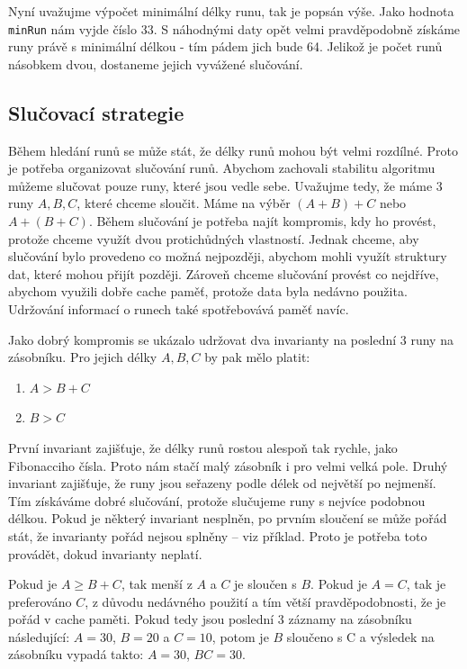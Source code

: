 \documentclass[thesis=B,czech]{FITthesis}[2019/12/23]
\begin{document}
Nyní uvažujme výpočet minimální délky runu, tak je popsán výše. Jako hodnota \texttt{minRun} nám vyjde číslo 33. S náhodnými daty opět velmi pravděpodobně získáme runy právě s minimální délkou - tím pádem jich bude 64. Jelikož je počet runů násobkem dvou, dostaneme jejich vyvážené slučování.

\subsection{Slučovací strategie}
Během hledání runů se může stát, že délky runů mohou být velmi rozdílné. Proto je potřeba organizovat slučování runů. Abychom zachovali stabilitu algoritmu můžeme slučovat pouze runy, které jsou vedle sebe. Uvažujme tedy, že máme 3 runy $ A, B, C $, které chceme sloučit. Máme na výběr $ (A+B)+C $ nebo $ A+(B+C) $. Během slučování je potřeba najít kompromis, kdy ho provést, protože chceme využít dvou protichůdných vlastností. Jednak chceme, aby slučování bylo provedeno co možná nejpozději, abychom mohli využít struktury dat, které mohou přijít později. Zároveň chceme slučování provést co nejdříve, abychom využili dobře cache paměť, protože data byla nedávno použita. Udržování informací o runech také spotřebovává paměť navíc.

Jako dobrý kompromis se ukázalo udržovat dva invarianty na poslední 3 runy na zásobníku. Pro jejich délky $A, B, C$ by pak mělo platit: 
\begin{center}
\begin{varwidth}{\textwidth}
\begin{enumerate}
	\item $ A > B + C $
	\item $ B > C $
\end{enumerate}
\end{varwidth}
\end{center} 
První invariant zajišťuje, že délky runů rostou alespoň tak rychle, jako Fibonacciho čísla. Proto nám stačí malý zásobník i pro velmi velká pole. Druhý invariant zajišťuje, že runy jsou seřazeny podle délek od největší po nejmenší. Tím získáváme dobré slučování, protože slučujeme runy s nejvíce podobnou délkou. Pokud je některý invariant nesplněn, po prvním sloučení se může pořád stát, že invarianty pořád nejsou splněny -- viz příklad. Proto je potřeba toto provádět, dokud invarianty neplatí. 

Pokud je $A \ge B + C$, tak menší z $A$ a $C$ je sloučen s $B$. Pokud je $A=C$, tak je preferováno $C$, z důvodu nedávného použití a tím větší pravděpodobnosti, že je pořád v cache paměti. Pokud tedy jsou poslední 3 záznamy na zásobníku následující: $A=30$, $B=20$ a $C=10$, potom je $B$ sloučeno s C a výsledek na zásobníku vypadá takto: $A=30$, $BC=30$. 
\end{document}
